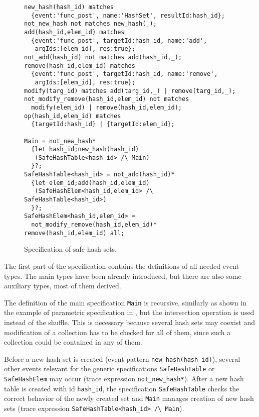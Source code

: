 \begin{figure}[h]
\begin{lstlisting}[basicstyle=\ttfamily\scriptsize]
new_hash(hash_id) matches
  {event:'func_post', name:'HashSet', resultId:hash_id};
not_new_hash not matches new_hash(_);
add(hash_id,elem_id) matches
  {event:'func_post', targetId:hash_id, name:'add',
   argIds:[elem_id], res:true};
not_add(hash_id) not matches add(hash_id,_);
remove(hash_id,elem_id) matches
  {event:'func_post', targetId:hash_id, name:'remove',
   argIds:[elem_id], res:true};
modify(targ_id) matches add(targ_id,_) | remove(targ_id,_);
not_modify_remove(hash_id,elem_id) not matches
  modify(elem_id) | remove(hash_id,elem_id);
op(hash_id,elem_id) matches
  {targetId:hash_id} | {targetId:elem_id};

Main = not_new_hash*
  {let hash_id;new_hash(hash_id)
   (SafeHashTable<hash_id> /\ Main)
  }?;
SafeHashTable<hash_id> = not_add(hash_id)*
  {let elem_id;add(hash_id,elem_id)
   (SafeHashElem<hash_id,elem_id> /\ SafeHashTable<hash_id>)
  }?;
SafeHashElem<hash_id,elem_id> = 
  not_modify_remove(hash_id,elem_id)* remove(hash_id,elem_id) all;
\end{lstlisting}
\caption{Specification of safe hash sets.}\label{list:hash}
\end{figure}

The first part of the specification contains the definitions of all needed event types. The main types have been already introduced,
but there are also some auxiliary types, most of them derived.

The definition of the main specification \lstinline{Main} is recursive, similarly as shown in the example of parametric specification in
, but the intersection operation is used instead of the shuffle. This is necessary because several hash sets may
coexist and modification of a collection has to be checked for all of them, since such a collection could be contained in any of them.

Before a new hash set is created (event pattern \lstinline{new_hash(hash_id)}), several other events relevant for the generic specifications \lstinline{SafeHashTable} or  \lstinline{SafeHashElem} may occur (trace expression \lstinline{not_new_hash*}).
After a new hash table is created with id \lstinline{hash_id}, the specification \lstinline{SafeHashTable} checks the correct behavior of
the newly created set and \lstinline{Main} manages creation of new hash sets (trace expression \lstinline{SafeHashTable<hash_id> /\ Main}).


